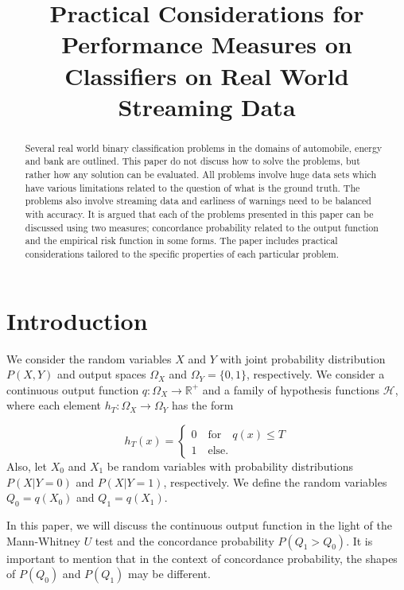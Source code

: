 \documentclass{article}
\title{Practical Considerations for Performance Measures on Classifiers on Real World Streaming Data}
\date{}
\theoremstyle{theorem}
\theoremstyle{definition}
\begin{document}
\maketitle

\begin{abstract}
Several real world binary classification problems in the domains of automobile, energy and bank are outlined.  This paper do not discuss how to solve the problems, but rather how any solution can be evaluated.  All problems involve huge data sets which have various limitations related to the question of what is the ground truth. The problems also involve streaming data and earliness of warnings need to be balanced with accuracy.  It is argued that each of the problems presented in this paper can be discussed using two measures; concordance probability related to the output function and the empirical risk function in some forms.  The paper includes practical considerations tailored to the specific properties of each particular problem.
\end{abstract}

\section{Introduction}





We consider the random variables $X$ and $Y$ with joint probability distribution $P(X,Y)$ and output spaces $\Omega_X$ and $\Omega_Y = \{0,1\}$, respectively.  We consider a continuous output function $q: \Omega_X \rightarrow \mathbb{R}^+$ and a family of hypothesis functions $\mathcal{H}$, where each element $h_T:\Omega_X \rightarrow \Omega_Y$ has the form 

\begin{equation}
\label{eq:ht}
h_T(x) = 
\begin{cases}
0 \quad \mbox{for} \quad q(x) \leq T\\
1 \quad \mbox{else}.
\end{cases}
\end{equation}
Also, let $X_0$ and $X_1$ be random variables with probability distributions $P(X | Y = 0)$ and $P(X | Y = 1)$, respectively.  We define the random variables $Q_0 = q(X_0)$ and $Q_1 = q(X_1)$.

In this paper, we will discuss the continuous output function in the light of the Mann-Whitney $U$ test and the concordance probability $P(Q_1 > Q_0)$.  It is important to mention that in the context of concordance probability, the shapes of $P(Q_0)$ and $P(Q_1)$ may be different. 
\end{document}
